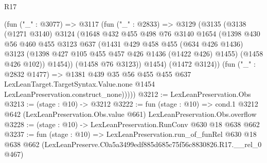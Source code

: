 \begin{lexlean}{R17}
\begin{coremodule}
          (fun ("_" : @3077) =>
          @3117
            (fun ("_" : @2833) =>
            @3129
              (@3135
                (@3138
                  (@1271 @3140)
                  @3124
                  (@1648
                    @432
                    @455
                    @498
                    @76
                    @3140
                    @1654
                    (@1398
                      @430
                      @56
                      @460
                      @455
                      @3123
                      @637
                      (@1431
                        @429
                        @458
                        @455
                        (@634 @426 @1436)
                        @3123
                        (@1398 @427 @105 @455 @457 @426 @1436 (@1422 @426) @1455)
                        (@1458 @426 @102))
                      @1454))
                  (@1458 @76 @3123))
                @1454)
              (@1472 @3124))
            (fun ("_" : @2832 @1477) =>
            @1381
              @439
              @35
              @56
              @455
              @455
              @637
              LexLeanTarget.TargetSyntax.Value.none
              @1454
              LexLeanPreservation.construct_none)))))
@3212 := LexLeanPreservation.Obs
@3213 := (stage : @10) -> @3212
@3222 := fun (stage : @10) =>
  cond.{1} @3212 @642 (LexLeanPreservation.Obs.value @661) LexLeanPreservation.Obs.overflow
@3228 := (stage : @10) -> LexLeanPreservation.RunConv @630 @18 @638 @662
@3237 := fun (stage : @10) =>
  LexLeanPreservation.run_of_funRel
    @630
    @18
    @638
    @662
    (LexLeanPreserve.C0a5a3499edf885d685c75f56c8830826.R17.__rel_0 @467)
\end{coremodule}
\end{lexlean}
